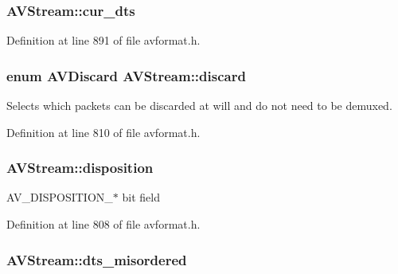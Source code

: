 \subsubsection[{\texorpdfstring{cur\+\_\+dts}{cur_dts}}]{ A\+V\+Stream\+::cur\+\_\+dts}\hypertarget{struct_a_v_stream_ad552f602c2113bd5152cff3c58ba1f9f}{}\label{struct_a_v_stream_ad552f602c2113bd5152cff3c58ba1f9f}


Definition at line 891 of file avformat.\+h.

\subsubsection[{\texorpdfstring{discard}{discard}}]{\setlength{\rightskip}{0pt plus 5cm}enum {\bf A\+V\+Discard} A\+V\+Stream\+::discard}\hypertarget{struct_a_v_stream_a492fcecc45dbbd8da51edd0124e9dd30}{}\label{struct_a_v_stream_a492fcecc45dbbd8da51edd0124e9dd30}


Selects which packets can be discarded at will and do not need to be demuxed. 



Definition at line 810 of file avformat.\+h.

\subsubsection[{\texorpdfstring{disposition}{disposition}}]{ A\+V\+Stream\+::disposition}\hypertarget{struct_a_v_stream_aea05abdb8e45405048d7923a68c23ef5}{}\label{struct_a_v_stream_aea05abdb8e45405048d7923a68c23ef5}
A\+V\+\_\+\+D\+I\+S\+P\+O\+S\+I\+T\+I\+O\+N\+\_\+$\ast$ bit field 

Definition at line 808 of file avformat.\+h.

\subsubsection[{\texorpdfstring{dts\+\_\+misordered}{dts_misordered}}]{ A\+V\+Stream\+::dts\+\_\+misordered}\hypertarget{struct_a_v_stream_a02b107869ea9e14c784d1bfdade3ebf2}{}\label{struct_a_v_stream_a02b107869ea9e14c784d1bfdade3ebf2}


